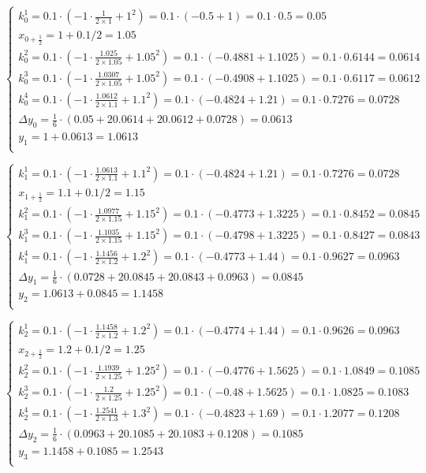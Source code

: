 \documentclass[10pt, a4paper]{scrartcl}
\begin{document}
\(\displaystyle \begin{cases} k_{0}^1 = 0.1 \cdot (-1 \cdot \frac{1}{2\times 1} + 1^2) = 0.1\cdot (-0.5 + 1) = 0.1 \cdot 0.5 = 0.05\\ x_{0 + \frac{1}{2}} = 1 + 0.1/2 = 1.05\\ k_{0}^2 = 0.1 \cdot (-1 \cdot \frac{1.025}{2\times 1.05} + 1.05^2) = 0.1\cdot (-0.4881 + 1.1025) = 0.1 \cdot 0.6144 = 0.0614\\ k_{0}^3 = 0.1 \cdot (-1 \cdot \frac{1.0307}{2\times 1.05} + 1.05^2) = 0.1\cdot (-0.4908 + 1.1025) = 0.1 \cdot 0.6117 = 0.0612\\ k_{0}^4 = 0.1 \cdot (-1 \cdot \frac{1.0612}{2\times 1.1} + 1.1^2) = 0.1\cdot (-0.4824 + 1.21) = 0.1 \cdot 0.7276 = 0.0728\\ \Delta y_{0} = \frac{1}{6} \cdot (0.05 + 20.0614 + 20.0612 + 0.0728) = 0.0613\\ y_{1} = 1 + 0.0613 = 1.0613\\ \end{cases}\)

\(\displaystyle \begin{cases} k_{1}^1 = 0.1 \cdot (-1 \cdot \frac{1.0613}{2\times 1.1} + 1.1^2) = 0.1\cdot (-0.4824 + 1.21) = 0.1 \cdot 0.7276 = 0.0728\\ x_{1 + \frac{1}{2}} = 1.1 + 0.1/2 = 1.15\\ k_{1}^2 = 0.1 \cdot (-1 \cdot \frac{1.0977}{2\times 1.15} + 1.15^2) = 0.1\cdot (-0.4773 + 1.3225) = 0.1 \cdot 0.8452 = 0.0845\\ k_{1}^3 = 0.1 \cdot (-1 \cdot \frac{1.1035}{2\times 1.15} + 1.15^2) = 0.1\cdot (-0.4798 + 1.3225) = 0.1 \cdot 0.8427 = 0.0843\\ k_{1}^4 = 0.1 \cdot (-1 \cdot \frac{1.1456}{2\times 1.2} + 1.2^2) = 0.1\cdot (-0.4773 + 1.44) = 0.1 \cdot 0.9627 = 0.0963\\ \Delta y_{1} = \frac{1}{6} \cdot (0.0728 + 20.0845 + 20.0843 + 0.0963) = 0.0845\\ y_{2} = 1.0613 + 0.0845 = 1.1458\\ \end{cases}\)

\(\displaystyle \begin{cases} k_{2}^1 = 0.1 \cdot (-1 \cdot \frac{1.1458}{2\times 1.2} + 1.2^2) = 0.1\cdot (-0.4774 + 1.44) = 0.1 \cdot 0.9626 = 0.0963\\ x_{2 + \frac{1}{2}} = 1.2 + 0.1/2 = 1.25\\ k_{2}^2 = 0.1 \cdot (-1 \cdot \frac{1.1939}{2\times 1.25} + 1.25^2) = 0.1\cdot (-0.4776 + 1.5625) = 0.1 \cdot 1.0849 = 0.1085\\ k_{2}^3 = 0.1 \cdot (-1 \cdot \frac{1.2}{2\times 1.25} + 1.25^2) = 0.1\cdot (-0.48 + 1.5625) = 0.1 \cdot 1.0825 = 0.1083\\ k_{2}^4 = 0.1 \cdot (-1 \cdot \frac{1.2541}{2\times 1.3} + 1.3^2) = 0.1\cdot (-0.4823 + 1.69) = 0.1 \cdot 1.2077 = 0.1208\\ \Delta y_{2} = \frac{1}{6} \cdot (0.0963 + 20.1085 + 20.1083 + 0.1208) = 0.1085\\ y_{3} = 1.1458 + 0.1085 = 1.2543\\ \end{cases}\)
\end{document}
